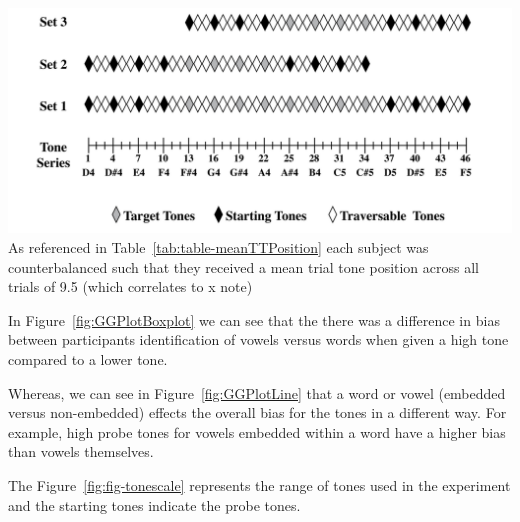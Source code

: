\documentclass[
  man]{apa6}
\begin{document}
\includegraphics{tones.png}
As referenced in Table~\ref{tab:table-meanTTPosition} each subject was counterbalanced such that they received a mean trial tone position across all trials of 9.5 (which correlates to x note)

In Figure~\ref{fig:GGPlotBoxplot} we can see that the there was a difference in bias between participants identification of vowels versus words when given a high tone compared to a lower tone.

Whereas, we can see in Figure~\ref{fig:GGPlotLine} that a word or vowel (embedded versus non-embedded) effects the overall bias for the tones in a different way. For example, high probe tones for vowels embedded within a word have a higher bias than vowels themselves.

The Figure~\ref{fig:fig-tonescale} represents the range of tones used in the experiment and the starting tones indicate the probe tones.
\end{document}
